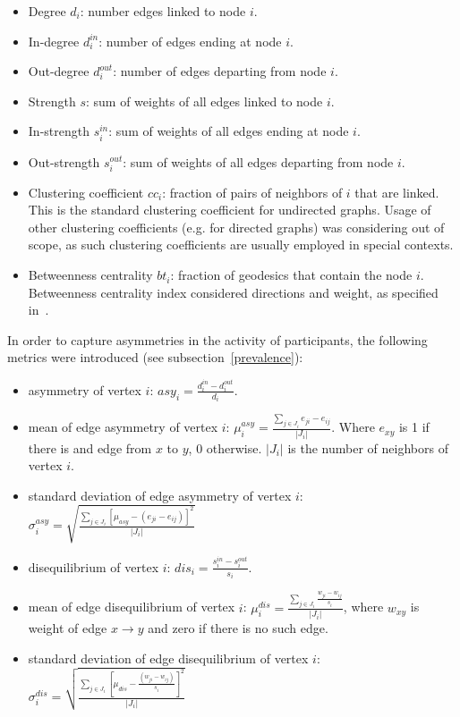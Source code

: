 \documentclass[%
 aip,
 jmp,%
 amsmath,amssymb,
 reprint,%
]{revtex4-1}
\begin{document}
\begin{itemize}
    \item Degree $d_i$: number edges linked to node $i$.
    \item In-degree $d_i^{in}$: number of edges ending at node $i$.
    \item Out-degree $d_i^{out}$: number of edges departing from node $i$.
    \item Strength $s$: sum of weights of all edges linked to node $i$.
    \item In-strength $s_i^{in}$: sum of weights of all edges ending at node $i$.
    \item Out-strength $s_i^{out}$: sum of weights of all edges departing from node $i$.
    \item Clustering coefficient $cc_i$: fraction of pairs of neighbors of $i$ that are linked. This is the standard clustering coefficient for undirected graphs. Usage of other clustering coefficients (e.g. for directed graphs) was considering out of scope, as such clustering coefficients are usually employed in special contexts. 
    \item Betweenness centrality $bt_i$: fraction of geodesics that contain the node $i$. Betweenness centrality index considered directions and weight, as specified in~\cite{faster}.
\end{itemize}

In order to capture asymmetries in the activity of participants, the following metrics were introduced (see subsection~\ref{prevalence}):

\begin{itemize}
    \item asymmetry of vertex $i$: $asy_i=\frac{d_i^{in}-d_i^{out}}{d_i}$.
    \item mean of edge asymmetry of vertex $i$: $\mu_i^{asy}=\frac{\sum_{j\in J_i} e_{ji}-e_{ij}}{|J_i|}$. Where $e_{xy}$ is 1 if there is and edge from $x$ to $y$, $0$ otherwise. $|J_i|$ is the number of neighbors of vertex $i$.
    \item standard deviation of edge asymmetry of vertex $i$: $\sigma_i^{asy}=\sqrt{\frac{\sum_{j\in J_i}[\mu_{asy} -(e_{ji}-e_{ij}) ]^2  }{|J_i|}  }$
    \item disequilibrium of vertex $i$: $dis_i=\frac{s_i^{in}-s_i^{out}}{s_i}$.
    \item mean of edge disequilibrium of vertex $i$: $\mu_i^{dis}=\frac{\sum_{j \in J_i}\frac{w_{ji}-w_{ij}}{s_i}}{|J_i|}$, where $w_{xy}$ is weight of edge $x\rightarrow y$ and zero if there is no such edge.
    \item standard deviation of edge disequilibrium of vertex $i$: $\sigma_i^{dis}=\sqrt{\frac{\sum_{j\in J_i}[\mu_{dis}-\frac{(w_{ji}-w_{ij})}{s_i}]^2}{|J_i|}}$
\end{itemize}
\end{document}
